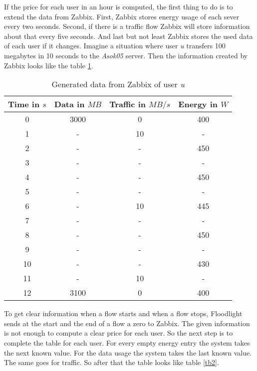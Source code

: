  If the price for each user in an hour is computed, the first thing to do is to extend the data from Zabbix. First, Zabbix stores energy usage of each sever every two seconds. Second, if there is a traffic flow Zabbix will store information about that every five seconds. And last but not least Zabbix stores the used data of each user if it changes. Imagine a situation where user \textit{u} transfers 100 megabytes in 10 seconds to the \textit{Asok05} server. Then the information created by Zabbix looks like the table \ref{tb1}. 
\begin{table}
\centering
\caption{Generated data from Zabbix of user \textit{u}}
\begin{tabular}{|c|c|c|c|}
 \hline Time in $s$ & Data in $MB$ & Traffic in $MB/s$ & Energy in $W$ \\ 
  \hline 0 & 3000 & 0 & 400 \\ 
 \hline 1 & - & 10 & - \\ 
 \hline 2 & - & - & 450 \\ 
 \hline 3 & - & - & -\\ 
 \hline 4 & - & - & 450 \\ 
 \hline 5 & - & - & - \\
 \hline 6 & - & 10 & 445 \\ 
 \hline 7 & - & - & -\\ 
 \hline 8 & - & - & 450 \\ 
 \hline 9 & - & - & - \\  
 \hline 10 & - & - & 430 \\
  \hline 11 & - & 10 & - \\
 \hline 12 & 3100 & 0 & 400 \\  
 \hline 
 \end{tabular}
 \label{tb1} 
 \end{table}
 
 To get clear information when a flow starts and when a flow stops, Floodlight sends at the start and the end of a flow a zero to Zabbix. The given information is not enough to compute a clear price for each user. So the next step is to complete the table for each user. For every empty energy entry the system takes the next known value. For the data usage the system takes the last known value. The same goes for traffic. So after that the table looks like table \ref{tb2}.
 
